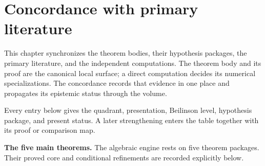 \chapter{Concordance with primary literature}
\label{chap:concordance}


This chapter synchronizes the theorem bodies, their hypothesis
packages, the primary literature, and the independent computations.
The theorem body and its proof are the canonical local surface; a
direct computation decides its numerical specializations.  The
concordance records that evidence in one place and propagates its
epistemic status through the volume.

Every entry below gives the quadrant, presentation, Beilinson level,
hypothesis package, and present status.  A later strengthening enters
the table together with its proof or comparison map.

\bigskip

\noindent\textbf{The five main theorems.}\quad
The algebraic engine rests on five theorem packages.
Their proved core and conditional refinements are recorded explicitly below.

